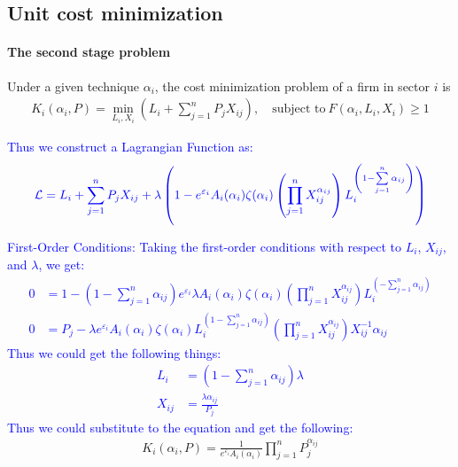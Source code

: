 \documentclass[11pt]{article}
\theoremstyle{definition}
\begin{document}
	\subsection{Unit cost minimization}
	\paragraph{The second stage problem}
	Under a given technique $\alpha_i$, the cost minimization problem of a firm in sector $i$ is
	\begin{align}
		K_i(\alpha_i, P) = \min\limits_{L_i, X_i} \left( L_i + \sum\limits_{j=1}^n P_j X_{ij} \right),\quad \text{subject to} \ F(\alpha_i, L_i, X_i) \geqslant 1 \label{eq-7}
	\end{align}
	
	\textcolor{blue}{Thus we construct a Lagrangian Function as:}
	\begin{align*}
		\color{blue} \mathcal{L} = L_i + \sum_{j=1}^{n} P_j X_{ij} + \lambda \left(1 - e^{\varepsilon_i} A_i(\alpha_i) \zeta(\alpha_i) \left(\prod\limits_{j=1}^{n} X_{ij}^{\alpha_{ij}}\right) L_i^{\left(1 - \sum\limits_{j=1}^{n} \alpha_{ij}\right)} \right)
	\end{align*}
	
	\textcolor{blue}{First-Order Conditions: Taking the first-order conditions with respect to \(L_i\), \(X_{ij}\), and \(\lambda\), we get:}
	\textcolor{blue}{\begin{align*}
	 	0 &= 1 - \left(1 - \sum\limits_{j=1}^{n} \alpha_{ij}\right)  e^{\varepsilon_i} \lambda A_i(\alpha_i) \zeta(\alpha_i) \left(\prod\limits_{j=1}^{n} X_{ij}^{\alpha_{ij}}\right) L_i^{\left(- \sum\limits_{j=1}^{n} \alpha_{ij}\right)} \\
		0 &= P_j - \lambda e^{\varepsilon_i} A_i(\alpha_i) \zeta(\alpha_i) L_i^{\left(1 - \sum\limits_{j=1}^{n} \alpha_{ij}\right)} \left(\prod\limits_{j=1}^{n} X_{ij}^{\alpha_{ij}}\right) X_{ij}^{- 1} \alpha_{ij} 
	\end{align*}}
	\textcolor{blue}{Thus we could get the following things:}
	\textcolor{blue}{\begin{align*}
			L_i &= \left(1 - \sum\limits_{j=1}^n \alpha_{ij} \right) \lambda \\
			X_{ij} &= \frac{\lambda \alpha_{ij}}{P_j}
	\end{align*}}
	\textcolor{blue}{Thus we could substitute to the equation and get the following:}
	\begin{align}
		K_i(\alpha_i, P) = \frac{1}{e^{\varepsilon_i} A_i(\alpha_i)} \prod\limits_{j=1}^n P_j^{\alpha_{ij}} \label{eq-8}
	\end{align}
	
\end{document}
